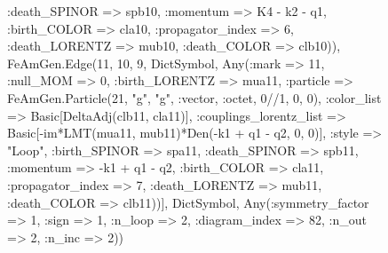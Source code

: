 \documentclass{revtex4}
\begin{document}
\begin{figure}[!htb]
\begin{center}
{:death_SPINOR => spb10, :momentum => K4 - k2 - q1, :birth_COLOR => cla10, :propagator_index => 6, :death_LORENTZ => mub10, :death_COLOR => clb10)), FeAmGen.Edge(11, 10, 9, Dict{Symbol, Any}(:mark => 11, :null_MOM => 0, :birth_LORENTZ => mua11, :particle => FeAmGen.Particle(21, "g", "g", :vector, :octet, 0//1, 0, 0), :color_list => Basic[DeltaAdj(clb11, cla11)], :couplings_lorentz_list => Basic[-im*LMT(mua11, mub11)*Den(-k1 + q1 - q2, 0, 0)], :style => "Loop", :birth_SPINOR => spa11, :death_SPINOR => spb11, :momentum => -k1 + q1 - q2, :birth_COLOR => cla11, :propagator_index => 7, :death_LORENTZ => mub11, :death_COLOR => clb11))], Dict{Symbol, Any}(:symmetry_factor => 1, :sign => 1, :n_loop => 2, :diagram_index => 82, :n_out => 2, :n_inc => 2)) 
}
\end{center}
\end{figure}
\end{document}
